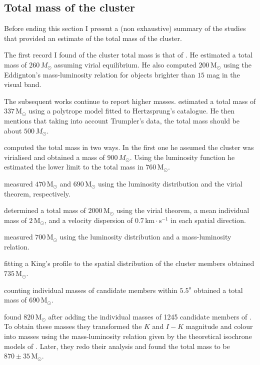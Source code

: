 \subsection{Total mass of the cluster}
Before ending this section I present a (non exhaustive) summary of the studies that provided an estimate of the total mass of the cluster.

The first record I found of the cluster total mass is that of \citet{1938AJ.....47...25T}. He estimated a total mass of $260 \,M_{\odot}$ assuming virial equilibrium. He also computed $200 \,\mathrm{M_{\odot}}$ using the Eddignton's mass-luminosity relation for objects brighter than $15$ mag in the visual band.

The subsequent works continue to report higher masses. \citet{1956MNRAS.116..296W} estimated a total mass of $337 \,\mathrm{M_{\odot}}$ using a polytrope model fitted to Hertzsprung's catalogue. He then mentions that taking into account Trumpler's data, the total mass should be about $500\,M_{\odot}$. 

\citet{Limber1962} computed the total mass in two ways. In the first one he assumed the cluster was virialised and obtained a mass of $900 \,M_{\odot}$. Using the luminosity function he estimated the lower limit to the total mass in $760 \,\mathrm{M_{\odot}}$. 

\citet{1970AJ.....75..563J} measured $470\,\mathrm{M_{\odot}}$ and $690\,\mathrm{M_{\odot}}$ using the luminosity distribution and the virial theorem, respectively. 

\citet{1980IAUS...85..157V}  determined a total mass of $2000 \,\mathrm{M_{\odot}}$ using the virial theorem, a mean individual mass of $2\,\mathrm{M_{\odot}}$, and a velocity dispersion of $0.7\,\mathrm{km \cdot s^{-1}}$ in each spatial direction. 

\citet{1995JKAS...28...45L} measured $700 \,\mathrm{M_{\odot}}$ using the luminosity distribution and a mass-luminosity relation. 

\citet{Pinfield1998} fitting a King's profile to the spatial distribution of the cluster members obtained $735\,\mathrm{M_{\odot}}$. 

\citet{Adams2001} counting individual masses of candidate members within $5.5^o$ obtained a total mass of $690 \,\mathrm{M_{\odot}}$. 

\citet{Converse2008} found $820 \,\mathrm{M_{\odot}}$ after adding the individual masses of 1245  candidate members of \citet{Stauffer2007}. To obtain these masses they  transformed the $K$ and $I-K$ magnitude and colour into masses using the mass-luminosity relation given by the theoretical isochrone models of \citet{1998A&A...337..403B}. Later, \citet{Converse2010} they redo their analysis and found the total mass to be $870\pm35\,\mathrm{M_{\odot}}$.


